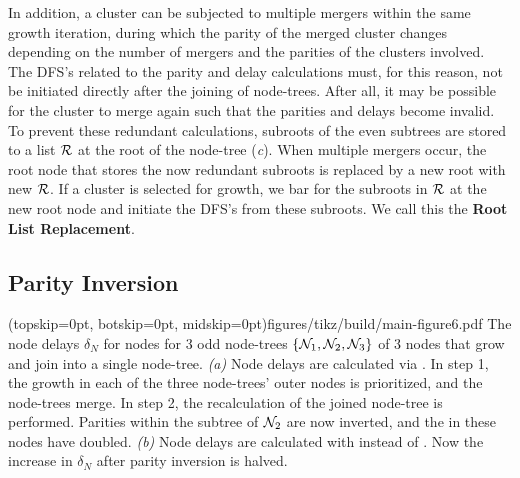 In addition, a cluster can be subjected to multiple mergers within the same growth iteration, during which the parity of the merged cluster changes depending on the number of mergers and the parities of the clusters involved. The DFS's related to the parity and delay calculations must, for this reason, not be initiated directly after the joining of node-trees. After all, it may be possible for the cluster to merge again such that the parities and delays become invalid. To prevent these redundant calculations, subroots of the even subtrees are stored to a list $\mathcal{R}$ at the root of the node-tree (\emph{c}). When multiple mergers occur, the root node that stores the now redundant subroots is replaced by a new root with new $\mathcal{R}$. If a cluster is selected for growth, we bar for the subroots in $\mathcal{R}$ at the new root node and initiate the DFS's from these subroots. We call this the \textbf{Root List Replacement}. 


\subsection{Parity Inversion}\label{sec:inversion}

\Figure[tb](topskip=0pt, botskip=0pt, midskip=0pt){figures/tikz/build/main-figure6.pdf}{
    The node delays $\delta_N$ for nodes for 3 odd node-trees $\{\mathcal{N}_1, \mathcal{N}_2, \mathcal{N}_3\}$ of 3 nodes that grow and join into a single node-tree. \emph{(a)} Node delays are calculated via . In step 1, the growth in each of the three node-trees' outer nodes is prioritized, and the node-trees merge. In step 2, the recalculation of the joined node-tree is performed. Parities within the subtree of $\mathcal{N}_2$ are now inverted, and the  in these nodes have doubled. \emph{(b)} Node delays are calculated with  instead of . Now the increase in $\delta_N$ after parity inversion is halved.\label{fig:partialdfs}}

